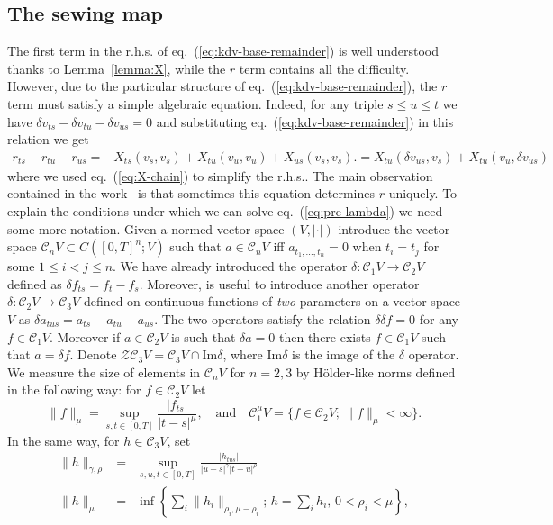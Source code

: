\documentclass[a4paper,11pt,reqno]{article}
\newcommand{\ott}{[0,T]}
\newcommand{\der}{\delta}
\newcommand{\CC}{\mathcal{C}}
\newcommand{\norm}[1]{\lVert #1\rVert}
\newcommand{\cZ}{\mathcal{Z}}
\begin{document}
\subsection{The sewing map}

The first term in the r.h.s. of eq.~(\ref{eq:kdv-base-remainder})  is well understood thanks to
Lemma~\ref{lemma:X}, while the $r$ term contains all the difficulty. However, due to the particular
structure of eq.~(\ref{eq:kdv-base-remainder}), the $r$ term must satisfy a simple
algebraic equation. Indeed, for any triple
$s\le u\le t$ we have
$
\der v_{ts} - \der v_{tu} - \der v_{us} = 0
$ and substituting eq.~(\ref{eq:kdv-base-remainder}) in this relation we get
\begin{equation}
\label{eq:pre-lambda}
  \begin{split}
 r_{ts} -
r_{tu} - r_{us}   = 
- X_{ts}(v_s,v_s) + X_{tu}(v_u,v_u) + X_{us}(v_s,v_s).   
    = 
 X_{tu}(\der v_{us},v_s) + X_{tu}(v_u,\der v_{us})   
  \end{split}
\end{equation}
where we used eq.~(\ref{eq:X-chain}) to simplify the r.h.s..
The main observation contained in the work~\cite{MR2091358} is that  sometimes this
equation determines $r$ uniquely.
To explain the conditions under which we can solve
eq.~(\ref{eq:pre-lambda}) we need some more notation. 
Given a normed vector space $(V,|\cdot|)$ introduce the vector space
$\CC_n V \subset C([0,T]^n;V)$ such that $a \in \CC_n V$ iff $ a_{t_1, \dots,t_n} = 0$ when $t_i
  = t_j$ for some $1 \le i < j \le n$. We have already introduced the
  operator $\der : \CC_1 V \to \CC_2 V$ defined as $\der f_{ts} = f_t
  - f_s$. Moreover, is useful to introduce
another operator $\der : \CC_2 V \to \CC_3 V$ defined on
continuous functions of \emph{two} parameters 
on a vector space $V$ as
$ \der a_{tus} = a_{ts} - a_{tu} - a_{us} $. The two operators satisfy
the relation $\der \der f = 0$ for any $f \in \CC_1 V$. Moreover if $a
\in \CC_2 V$ is such that $\der a = 0$ then  there exists $f \in \CC_1 V$ such that $ a = \der f$. Denote
$\cZ \CC_3 V = \CC_3 V \cap \mathrm{Im} \der$, where $\mathrm{Im} \der$ is the image of the $\der$ operator.
We measure the size of elements in $\CC_n V$ for $n=2,3$  by H\"older-like norms
defined in the following way: for $f \in \CC_2 V $ let
$$
\norm{f}_{\mu} =
\sup_{s,t\in\ott}\frac{|f_{ts}|}{|t-s|^\mu},
\quad\mbox{and}\quad
\CC_1^\mu V =\{ f \in \CC_2 V;\, \norm{f}_{\mu}<\infty  \}.
$$
In the same way, for $h \in \CC_3 V$, set
\begin{eqnarray}
  \label{eq:normOCC2}
  \norm{h}_{\gamma,\rho} &=& \sup_{s,u,t\in\ott} 
\frac{|h_{tus}|}{|u-s|^\gamma |t-u|^\rho}\\
\|h\|_\mu &= &
\inf\left \{\sum_i \|h_i\|_{\rho_i,\mu-\rho_i} ;\, h =
 \sum_i h_i,\, 0 < \rho_i < \mu \right\} ,\nonumber
\end{eqnarray}
\end{document}
